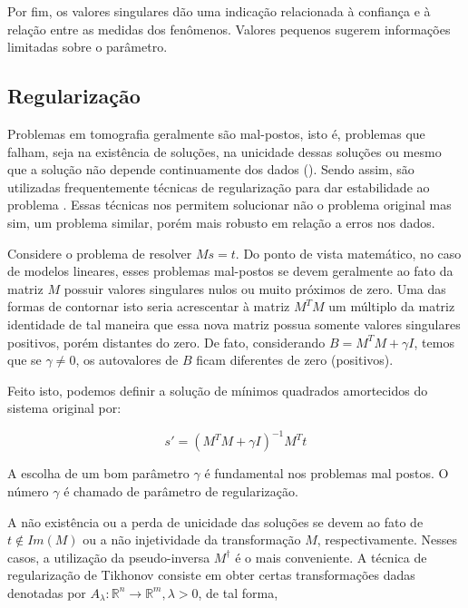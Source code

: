 \documentclass[a4paper, 12 pt]{article} %
\begin{document}
Por fim, os valores singulares dão uma indicação relacionada à confiança e à relação entre as medidas dos fenômenos. Valores pequenos sugerem informações limitadas sobre o parâmetro.


\subsection{Regularização}

Problemas em tomografia geralmente são mal-postos, isto é, problemas que falham, seja na existência de soluções, na unicidade dessas soluções ou mesmo que a solução não depende continuamente dos dados (\citealp{tempopercurso}).  Sendo assim, são utilizadas frequentemente técnicas de regularização para dar estabilidade ao problema \citep{natterer2001mathematical}. Essas técnicas nos permitem solucionar não o problema original
mas sim, um problema similar, porém mais robusto em relação a erros nos dados.

Considere o problema de resolver $Ms = t$. Do ponto de vista matemático, no caso de modelos lineares, esses problemas mal-postos se devem geralmente ao fato da matriz $M$ possuir valores singulares nulos ou muito próximos de zero. Uma das formas de contornar isto seria acrescentar à matriz $M^{T}M$ um múltiplo da matriz identidade de tal maneira que essa nova matriz possua somente valores singulares positivos, porém distantes do zero. De fato, considerando $B = M^{T}M + \gamma I$, temos que se $\gamma \neq 0$, os autovalores de $B$ ficam diferentes de zero (positivos).

Feito isto, podemos definir a solução de mínimos quadrados amortecidos do sistema original por:

\begin{equation}\label{eq:regularization}
s' = (M^{T}M + \gamma I)^{-1}M^{T}t
\end{equation}

A escolha de um bom parâmetro $\gamma$ é fundamental nos problemas mal postos. O número $\gamma$ é chamado de parâmetro de regularização.

A não existência ou a perda de unicidade das soluções se devem ao fato de $t \notin Im(M)$ ou a não injetividade da transformação $M$, respectivamente. Nesses casos, a utilização da pseudo-inversa $M^{\dagger}$ é o mais conveniente. A técnica de regularização de Tikhonov consiste em obter certas transformações dadas denotadas por
$A_{\lambda}: \mathbb{R}^{n} \longrightarrow \mathbb{R}^{m}, \lambda > 0$, de tal forma,
\end{document}
